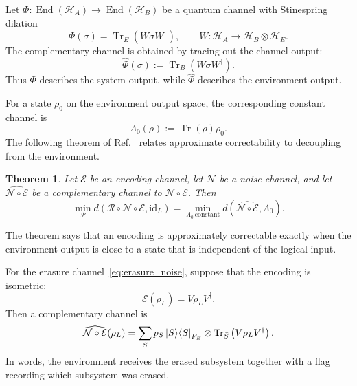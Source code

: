 \documentclass[10pt,twocolumn,superscriptaddress,aps,amsmath,amssymb,citeautoscript,floatfix,prx,longbibliography]{revtex4-2}
\newtheorem{theorem}{Theorem}
\theoremstyle{plain}
\theoremstyle{plain}
\theoremstyle{plain}
\theoremstyle{plain}
\theoremstyle{plain}
\theoremstyle{plain}
\begin{document}
Let $\Phi:\operatorname{End}(\mathcal H_A)\to\operatorname{End}(\mathcal H_B)$ be a quantum channel with Stinespring dilation
$$
    \Phi(\sigma)
    =
    \operatorname{Tr}_E(W\sigma W^\dagger),
    \qquad
    W:\mathcal H_A\to\mathcal H_B\otimes\mathcal H_E .
$$
The complementary channel is obtained by tracing out the channel output:
$$
    \widehat\Phi(\sigma)
    :=
    \operatorname{Tr}_B(W\sigma W^\dagger).
$$
Thus $\Phi$ describes the system output, while $\widehat\Phi$ describes the environment output.

For a state $\rho_0$ on the environment output space, the corresponding constant channel is
\begin{equation}\label{eq:constant_channel_def}
    \Lambda_0(\rho)
    :=
    \operatorname{Tr}(\rho)\rho_0 .
\end{equation}
The following theorem of Ref.~\cite{Beny2010} relates approximate correctability to decoupling from the environment.

\begin{theorem}\label{thm:beny}
Let $\mathcal E$ be an encoding channel, let $\mathcal N$ be a noise channel, and let $\widehat{\mathcal N\circ\mathcal E}$ be a complementary channel to $\mathcal N\circ\mathcal E$. Then
\begin{equation}\label{eq:beny}
    \min_{\mathcal R}
    d\left(
        \mathcal R\circ\mathcal N\circ\mathcal E,
        \mathrm{id}_L
    \right)
    =
    \min_{\Lambda_0\,\mathrm{constant}}
    d\left(
        \widehat{\mathcal N\circ\mathcal E},
        \Lambda_0
    \right).
\end{equation}
\end{theorem}

The theorem says that an encoding is approximately correctable exactly when the environment output is close to a state that is independent of the logical input.

For the erasure channel~\eqref{eq:erasure_noise}, suppose that the encoding is isometric:
\begin{equation}\label{eq:enc_isom}
    \mathcal E(\rho_L)
    =
    V\rho_LV^\dagger .
\end{equation}
Then a complementary channel is~\cite{Faist2020}
\begin{equation}\label{eq:dual_to_erasure}
    \widehat{\mathcal N\circ\mathcal E}(\rho_L)
    =
    \sum_S
    p_S
    \ket S\!\bra S_{F_E}
    \otimes
    \operatorname{Tr}_{\bar S}
    \left(
        V\rho_LV^\dagger
    \right).
\end{equation}
In words, the environment receives the erased subsystem together with a flag recording which subsystem was erased.
\end{document}
